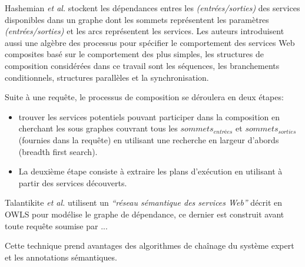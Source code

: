   \begin{text}
    Hashemian \textit{et al.} \cite{hashemian2006graph} stockent les
    dépendances entres les \textit{(entrées/sorties)} des services
    disponibles dans un graphe dont les sommets représentent les
    paramètres \textit{(entrées/sorties)} et les arcs représentent les
    services. Les auteurs introduisent aussi une algèbre des processus
    pour spécifier le comportement des services Web composites basé
    sur le comportement des plus simples, les structures de
    composition considérées dans ce travail sont les séquences, les
    branchements conditionnels, structures parallèles et la
    synchronisation.

    Suite à une requête, le processus de composition se déroulera en
    deux étapes:

    \begin{itemize}
    \item trouver les services potentiels pouvant participer dans la
      composition en cherchant les sous graphes couvrant tous les
      $sommets_{entrées}$ et $sommets_{sorties}$ (fournies dans la
      requête) en utilisant une recherche en largeur d'abords (breadth
      first search).

    \item La deuxième étape consiste à extraire les plans d'exécution
      en utilisant à partir des services découverts.
    \end{itemize}
  \end{text}

  \begin{text}


    Talantikite \textit{et al.} \cite{talantikite2009semantic}
    utilisent un \emph{``réseau sémantique des services Web''} décrit
    en \textsc{OWLS} pour modélise le graphe de dépendance, ce dernier
    est construit avant toute requête soumise par ...

    Cette technique prend avantages des algorithmes de chaînage du
    système expert et les annotations sémantiques.


  \end{text}

